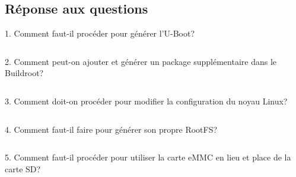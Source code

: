 \subsection{Réponse aux questions}
1. Comment faut-il procéder pour générer l'U-Boot?
\begin{lstlisting}

\end{lstlisting}
2. Comment peut-on ajouter et générer un package supplémentaire dans le Buildroot?
\begin{lstlisting}

\end{lstlisting}
3. Comment doit-on procéder pour modifier la configuration du noyau Linux?
\begin{lstlisting}

\end{lstlisting}
4. Comment faut-il faire pour générer son propre RootFS?
\begin{lstlisting}

\end{lstlisting}
5. Comment faut-il procéder pour utiliser la carte eMMC en lieu et place de la carte SD?
\begin{lstlisting}

\end{lstlisting}


